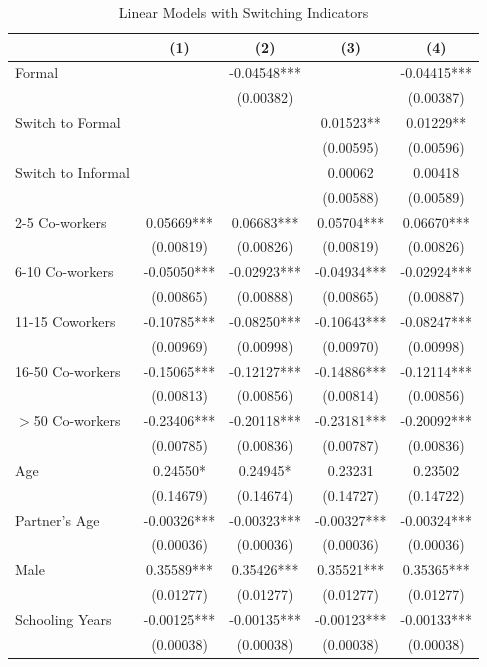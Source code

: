 \documentclass{svjour3}                     %
\begin{document}
\begin{table}[H] 
\begin{threeparttable}
\caption{Linear Models with Switching Indicators}
\label{table:smodels}
\centering 
\tiny
\begin{tabular}{lcccc} \hline \hline
 & (1) & (2) & (3) & (4) \\ \hline
Formal &  & -0.04548*** &  & -0.04415*** \\
 &  & (0.00382) &  & (0.00387) \\
Switch to Formal &  &  & 0.01523** & 0.01229** \\
 &  &  & (0.00595) & (0.00596) \\
Switch to Informal &  &  & 0.00062 & 0.00418 \\
 &  &  & (0.00588) & (0.00589) \\
2-5 Co-workers & 0.05669*** & 0.06683*** & 0.05704*** & 0.06670*** \\
 & (0.00819) & (0.00826) & (0.00819) & (0.00826) \\
6-10 Co-workers & -0.05050*** & -0.02923*** & -0.04934*** & -0.02924*** \\
 & (0.00865) & (0.00888) & (0.00865) & (0.00887) \\
11-15 Coworkers & -0.10785*** & -0.08250*** & -0.10643*** & -0.08247*** \\
 & (0.00969) & (0.00998) & (0.00970) & (0.00998) \\
16-50 Co-workers & -0.15065*** & -0.12127*** & -0.14886*** & -0.12114*** \\
 & (0.00813) & (0.00856) & (0.00814) & (0.00856) \\
$>$50 Co-workers & -0.23406*** & -0.20118*** & -0.23181*** & -0.20092*** \\
 & (0.00785) & (0.00836) & (0.00787) & (0.00836) \\
Age & 0.24550* & 0.24945* & 0.23231 & 0.23502 \\
 & (0.14679) & (0.14674) & (0.14727) & (0.14722) \\
Partner's Age & -0.00326*** & -0.00323*** & -0.00327*** & -0.00324*** \\
 & (0.00036) & (0.00036) & (0.00036) & (0.00036) \\
Male & 0.35589*** & 0.35426*** & 0.35521*** & 0.35365*** \\
 & (0.01277) & (0.01277) & (0.01277) & (0.01277) \\
Schooling Years & -0.00125*** & -0.00135*** & -0.00123*** & -0.00133*** \\
 & (0.00038) & (0.00038) & (0.00038) & (0.00038) \\

\end{tabular}
\end{threeparttable}
\end{table}
\end{document}
